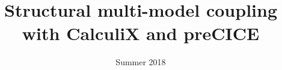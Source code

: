 \documentclass[a4paper, 11pt, oneside]{Thesis}  %
\begin{document}
\frontmatter      %

\title  {Structural multi-model coupling with CalculiX and preCICE}
\addresses  {\groupname\\\deptname\\\univname}  %
\date       {Summer 2018}
\subject    {}
\keywords   {}

\maketitle


\fancyhead{}  %
\rhead{\thepage}  %
\lhead{}  %

\pagestyle{fancy}  %



\clearpage  %

\tableofcontents  %


\end{document}

